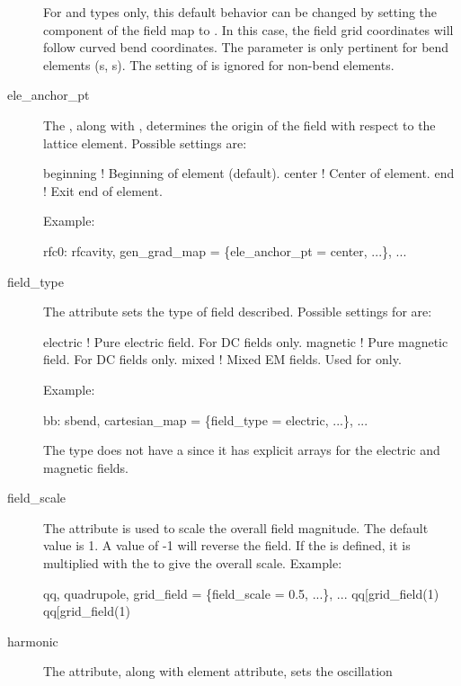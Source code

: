 \begin{description}
For  and  types only, this default behavior can be changed by
setting the  component of the field map to . In this case,
the field grid coordinates will follow curved bend coordinates.  The 
parameter is only pertinent for bend elements (s, s).  The setting of
 is ignored for non-bend elements.
%
\item[ele_anchor_pt] \Newline
The , along with , determines the origin of the field with
respect to the lattice element. Possible settings are:
\begin{example}
  beginning   ! Beginning of element (default).
  center      ! Center of element.
  end         ! Exit end of element.
\end{example}
Example:
\begin{example}
  rfc0: rfcavity, gen_grad_map = \{ele_anchor_pt = center, ...\}, ...
\end{example}
%
\item[field_type] \Newline
The  attribute sets the type of field described. Possible settings for
 are:
\begin{example}
  electric      ! Pure electric field. For DC fields only.
  magnetic      ! Pure magnetic field. For DC fields only.
  mixed         ! Mixed EM fields. Used for  only.
\end{example}
Example:
\begin{example}
  bb: sbend, cartesian_map = \{field_type = electric, ...\}, ...
\end{example}
The  type does not have a  since it has explicit arrays
for the electric and magnetic fields.
%
\item[field_scale] \Newline
The  attribute is used to scale the overall field magnitude. The default
value is 1. A value of -1 will reverse the field. If the  is
defined, it is multiplied with the  to give the overall scale.
Example:
\begin{example}
  qq, quadrupole, grid_field = \{field_scale = 0.5, ...\}, ...
  qq[grid_field(1)%
  qq[grid_field(1)%
\end{example}
%
\item[harmonic] \Newline
The  attribute, along with  element attribute, sets the oscillation

\end{description}

